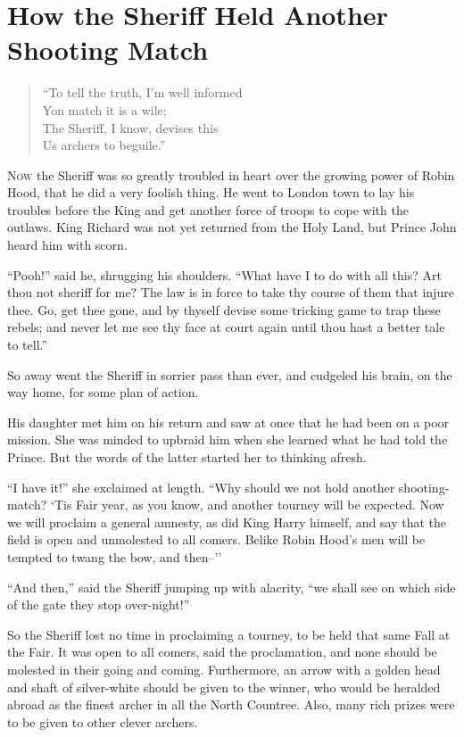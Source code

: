\chapter{How the Sheriff Held Another Shooting Match}

\begin{quote}
“To tell the truth, I’m well informed\\
Yon match it is a wile;\\
The Sheriff, I know, devises this\\
Us archers to beguile.”
\end{quote}

\lettrine{N}{ow} the Sheriff was so greatly troubled in heart over the growing power
of Robin Hood, that he did a very foolish thing. He went to London town
to lay his troubles before the King and get another force of troops to
cope with the outlaws. King Richard was not yet returned from the Holy
Land, but Prince John heard him with scorn.

``Pooh!'' said he, shrugging his shoulders. ``What have I to do with all
this? Art thou not sheriff for me? The law is in force to take thy
course of them that injure thee. Go, get thee gone, and by thyself
devise some tricking game to trap these rebels; and never let me see thy
face at court again until thou hast a better tale to tell.''

So away went the Sheriff in sorrier pass than ever, and cudgeled his
brain, on the way home, for some plan of action.

His daughter met him on his return and saw at once that he had been on a
poor mission. She was minded to upbraid him when she learned what he had
told the Prince. But the words of the latter started her to thinking
afresh.

``I have it!'' she exclaimed at length. ``Why should we not hold another
shooting-match? `Tis Fair year, as you know, and another tourney will be
expected. Now we will proclaim a general amnesty, as did King Harry
himself, and say that the field is open and unmolested to all comers.
Belike Robin Hood's men will be tempted to twang the bow, and then--''

``And then,'' said the Sheriff jumping up with alacrity, ``we shall see
on which side of the gate they stop over-night!''

So the Sheriff lost no time in proclaiming a tourney, to be held that
same Fall at the Fair. It was open to all comers, said the proclamation,
and none should be molested in their going and coming. Furthermore, an
arrow with a golden head and shaft of silver-white should be given to
the winner, who would be heralded abroad as the finest archer in all the
North Countree. Also, many rich prizes were to be given to other clever
archers.

